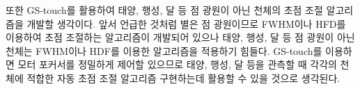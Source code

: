 또한 GS-touch를 활용하여 태양, 행성, 달 등 점 광원이 아닌 천체의 초점 조절 알고리즘을 개발할 생각이다. 앞서 언급한 것처럼 별은 점 광원이므로 FWHM이나 HFD를 이용하여 초점 조절하는 알고리즘이 개발되어 있으나 태양, 행성, 달 등 점 광원이 아닌 천체는 FWHM이나 HDF를 이용한 알고리즘을 적용하기 힘들다. GS-touch를 이용하면 모터 포커서를 정밀하게 제어할 있으므로 태양, 행성, 달 등을 관측할 때 각각의 천체에 적합한 자동 초점 조절 알고리즘 구현하는데 활용할 수 있을 것으로 생각된다. 
